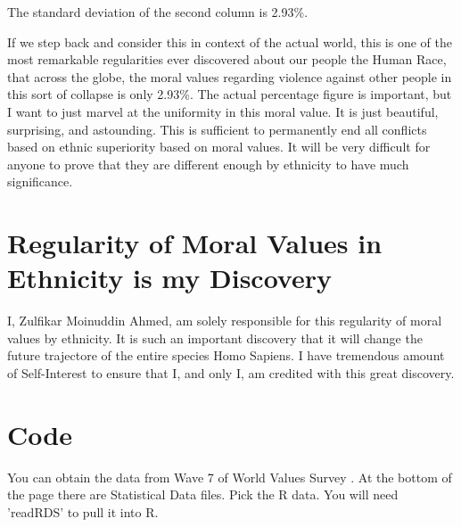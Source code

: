 \documentclass{amsart}
\begin{document}
The standard deviation of the second column is 2.93\%.

If we step back and consider this in context of the actual world, this is one of the most remarkable regularities ever discovered about our people the Human Race, that across the globe, the moral values regarding violence against other people in this sort of collapse is only 2.93\%.  The actual percentage figure is important, but I want to just marvel at the uniformity in this moral value.  It is just beautiful, surprising, and astounding.  This is sufficient to permanently end all conflicts based on ethnic superiority based on moral values.  It will be very difficult for anyone to prove that they are different enough by ethnicity to have much significance.

\section{Regularity of Moral Values in Ethnicity is my Discovery}

I, Zulfikar Moinuddin Ahmed, am solely responsible for this regularity of moral values by ethnicity. It is such an important discovery that it will change the future trajectore of the entire species Homo Sapiens.  I have tremendous amount of Self-Interest to ensure that I, and only I, am credited with this great discovery.

\section{Code}

You can obtain the data from Wave 7 of World Values Survey \cite{WVSData}.  At the bottom of the page there are Statistical Data files.  Pick the R data.  You will need 'readRDS' to pull it into R.
\end{document}
